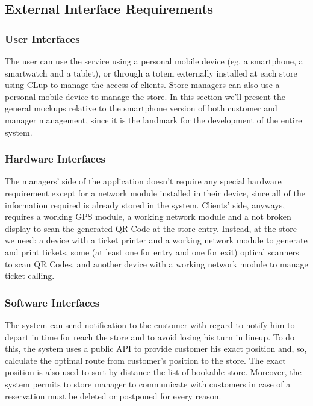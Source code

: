 \documentclass{article}
\begin{document}
	\subsection{External Interface Requirements}
	
		\subsubsection{User Interfaces}
		
			The user can use the service using a personal mobile device (eg. a smartphone, a smartwatch and a tablet), or through a totem externally installed at each store using CLup to manage the access of clients. Store managers can also use a personal mobile device to manage the store. In this section we’ll present the general mockups relative to the smartphone version of both customer and manager management, since it is the landmark for the development of the entire system.
		
		\subsubsection{Hardware Interfaces}
		
			The managers’ side of the application doesn’t require any special hardware requirement except for a network module installed in their device, since all of the information required is already stored in the system. Clients’ side, anyways, requires a working GPS module, a working network module and a not broken display to scan the generated QR Code at the store entry. Instead, at the store we need: a device with a ticket printer and a working network module to generate and print tickets, some (at least one for entry and one for exit) optical scanners to scan QR Codes, and another device with a working network module to manage ticket calling.
			
			
		\subsubsection{Software Interfaces}
		
			The system can send notification to the customer with regard to notify him to depart in time for reach the store and to avoid losing his turn in lineup. To do this, the system uses a public API to provide customer his exact position and, so, calculate the optimal route from customer's position to the store. The exact position is also used to sort by distance the list of bookable store. Moreover, the system permits to store manager to communicate with customers in case of a reservation must be deleted or postponed for every reason.
			
\end{document}
